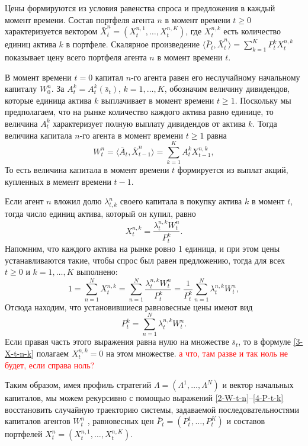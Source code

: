 \documentclass[a4paper,12pt,russian]{article} %
\theoremstyle{definition}
\begin{document}
Цены формируются из условия равенства спроса и предложения в каждый момент времени. 
Состав портфеля агента $n$ в момент времени $t\ge0$ характеризуется вектором $ \bar X_t^n=(X_{t}^{n,1},\dots,X_{t}^{n,K})$, где $X_{t}^{n,k}$ есть количество единиц актива $k$ в портфеле.
Скалярное произведение $\langle \bar P_{t}, \bar X_{t}^{n}\rangle=\sum_{k=1}^{K}P_{t}^k X_{t}^{n,k}$ показывает цену всего портфеля агента $n$ в момент времени $t$.

В момент времени $t=0$ капитал $n$-го агента равен его неслучайному начальному капиталу $W_{0}^{n}$.
За $A_{t}^k = A_{t}^k(  \bar s_{t} )$, $k=1,\dots,K$,  обозначим величину дивидендов, которые единица актива $k$ выплачивает в момент времени $t\ge 1$. Поскольку мы предполагаем, что на рынке количество каждого актива равно единице, то величина $A_{t}^k$ характеризует полную выплату дивидендов от актива $k$. Тогда величина капитала $n$-го агента 
в момент времени $t\ge1$ равна
\begin{equation}
W_{t}^{n}=\langle \bar A_{t}, \bar X_{t-1}^{n}\rangle=\sum_{k=1}^{K}A_{t}^k X_{t-1}^{n,k},
\label{2-W-t-n}%
\end{equation}
То есть величина капитала в момент времени $t$ формируется из выплат акций, купленных в мемент времени $t-1$.

Если агент $n$ вложил долю $\lambda_{t,k}^n$ своего капитала в покупку актива $k$ в момент $t$, тогда число единиц актива, который он купил, равно
\begin{equation}
X_{t}^{n,k} = \frac{\lambda_{t}^{n,k} W_t^n}{P_{t}^k}. \label{3-X-t-n-k}
\end{equation}
Напомним, что каждого актива на рынке ровно 1 единица, и при этом цены устанавливаются такие, чтобы спрос был равен предложению, тогда для всех $t\ge0$ и $k=1,\dots,K$ выполнено:
\[
1 = \sum_{n=1}^{N}X_{t}^{n,k} 
= \sum_{n=1}^{N}\frac{\lambda_{t}^{n,k}W_{t}^{n}}{P_{t}^k}= \frac{1}{P_{t}^k} \sum_{n=1}^{N}\lambda_{t}^{n,k}W_{t}^{n}, 
\]
Отсюда находим, что установившиеся равновесные цены имеют вид
\begin{equation}
P_{t}^k = \sum_{n=1}^{N}\lambda_{t}^{n,k}W_{t}^{n}. \label{4-P-t-k}
\end{equation}
Если правая часть этого выражения равна нулю на множестве  $\bar s_{t} $, то в формуле \eqref{3-X-t-n-k} полагаем $X_{t}^{n,k}=0$ на этом множестве. \textcolor{red} { а что, там разве и так ноль не будет, если справа ноль?} 

Таким образом, имея профиль стратегий $\Lambda=(\Lambda^1,\dots,\Lambda^N)$ и вектор начальных капиталов, мы можем рекурсивно с помощью выражений \eqref{2-W-t-n}--\eqref{4-P-t-k} восстановить случайную траекторию системы, задаваемой последовательностями капиталов агентов $W_t^n$ , равновесных цен $ \bar P_t=(P_{t}^1,\dots,P_{t}^K)$ и составов портфелей $X_t^n=(X_{t}^{n,1},\dots,X_{t}^{n,K})$.
\end{document}
